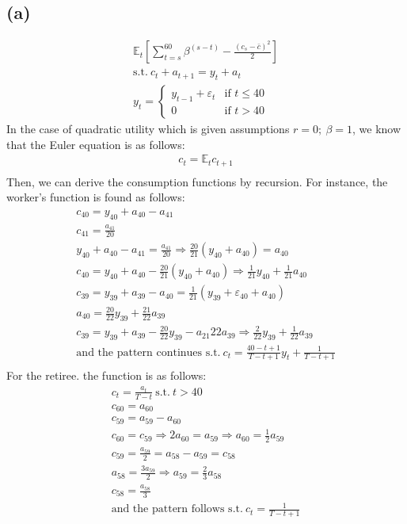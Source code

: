 \documentclass[10pt,a4paper]{article}
\newcommand{\sumtb}{\sum\limits_{t=s}^{60}}
\begin{document}
    \subsection*{(a)}
      \begin{gather*}
          \mathbb{E}_t[\sumtb\beta^{(s-t)} -\frac{(c_s-\bar{c})^2}{2}] \\
          \text{s.t.} \ c_t + a_{t+1} = y_t + a_t \\
          y_t = \begin{cases} 
          y_{t-1} + \varepsilon_t & \text{if } t \leq 40 \\
          0 & \text{if } t > 40 
          \end{cases}
      \end{gather*}
      In the case of quadratic utility which is given assumptions $r=0; \ \beta=1$, we know that the
      Euler equation is as follows:
      \begin{gather*}
          c_t = \mathbb{E}_tc_{t+1} \\
      \end{gather*}
      Then, we can derive the consumption functions by recursion. For instance, the worker's function is found as follows:
      \begin{gather*}
        c_{40} = y_{40} + a_{40} - a_{41} \\
        c_{41} = \frac{a_{41}}{20} \\
        y_{40} + a_{40} - a_{41} = \frac{a_{41}}{20} \Rightarrow \frac{20}{21}(y_{40}+a_{40}) = a_{40} \\
        c_{40} = y_{40} + a_{40} - \frac{20}{21}(y_{40}+a_{40}) \Rightarrow \frac{1}{21}y_{40} + \frac{1}{21}a_{40} \\
        c_{39} = y_{39} + a_{39} - a_{40} = \frac{1}{21}(y_{39} + \varepsilon_{40} + a_{40}) \\
        a_{40} = \frac{20}{22}y_{39} + \frac{21}{22}a_{39} \\
        c_{39} = y_{39} + a_{39} - \frac{20}{22}y_{39} - a_{21}{22}a_{39} \Rightarrow \frac{2}{22}y_{39} + \frac{1}{22}a_{39} \\
        \text{and the pattern continues s.t.} \ c_t = \frac{40-t+1}{T-t+1}y_t + \frac{1}{T-t+1} \\
      \end{gather*}
      For the retiree. the function is as follows:
      \begin{gather*}
        c_t = \frac{a_t}{T-t} \ \text{s.t.} \ t > 40  \\
        c_{60} = a_{60} \\
        c_{59} = a_{59}-a_{60} \\
        c_{60} = c_{59} \Rightarrow 2a_{60} = a_{59} \Rightarrow a_{60} = \frac{1}{2}a_{59} \\
        c_{59} = \frac{a_{59}}{2} = a_{58} - a_{59} = c_{58} \\
        a_{58} = \frac{3a_{59}}{2} \Rightarrow a_{59} = \frac{2}{3}a_{58} \\
        c_{58} = \frac{a_{58}}{3} \\
        \text{and the pattern follows s.t.} \ c_{t} = \frac{1}{T-t+1}
      \end{gather*}
\end{document}
